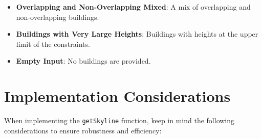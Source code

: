 \begin{itemize}
    \item \textbf{Overlapping and Non-Overlapping Mixed}: A mix of overlapping and non-overlapping buildings.
    
    \item \textbf{Buildings with Very Large Heights}: Buildings with heights at the upper limit of the constraints.
    
    \item \textbf{Empty Input}: No buildings are provided.
\end{itemize}

\section*{Implementation Considerations}

When implementing the \texttt{getSkyline} function, keep in mind the following considerations to ensure robustness and efficiency:

